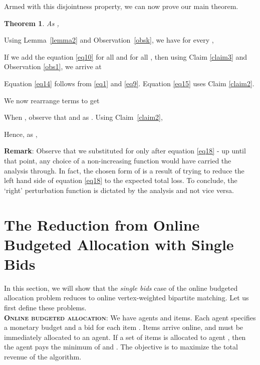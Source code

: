 \documentclass[11pt]{article}
\newtheorem{theorem}{Theorem}
\newcommand{\qed}{}
\newenvironment{proof}{\noindent{\em Proof:}}{\hfill \qed \medskip}
\begin{document}
Armed with this disjointness property, we can now prove our main theorem. 

\begin{theorem}
As ,

\end{theorem}
\begin{proof}
Using Lemma~\ref{lemma2} and Observation~\ref{obsk}, we have for every
,



If we add the equation \eqref{eq10} for all  and for all , then using Claim \ref{claim3} and Observation \ref{obs1}, we arrive at



Equation \eqref{eq14} follows from \eqref{eq1} and
\eqref{eq9}. Equation \eqref{eq15} uses Claim \ref{claim2}.

We now rearrange terms to get 


When , observe that
 and
 as . Using
Claim~\ref{claim2},



Hence, as ,  

\noindent \textbf{Remark}: Observe that we substituted for  only after equation \eqref{eq18} - up until that point, any choice of a non-increasing function  would have carried the analysis through. In fact, the chosen form of  is a result of trying to reduce the left hand side of equation \eqref{eq18} to the expected total loss. To conclude, the `right' perturbation function is dictated by the analysis and not vice versa.

\end{proof}










\appendix

\section{The Reduction from Online Budgeted Allocation with Single Bids}
\label{app7}

In this section, we will show that the \emph{single bids} case of the online budgeted allocation problem reduces to online vertex-weighted bipartite matching. Let us first define these problems.\\

\noindent \textbf{\textsc{Online budgeted allocation}}: We have  agents and  items. Each agent  specifies a monetary budget  and a bid  for each item . Items arrive online, and must be immediately allocated to an agent. If a set  of items is allocated to agent , then the agent pays the minimum of  and  . The objective is to maximize the total revenue of the algorithm.\\
\end{document}
